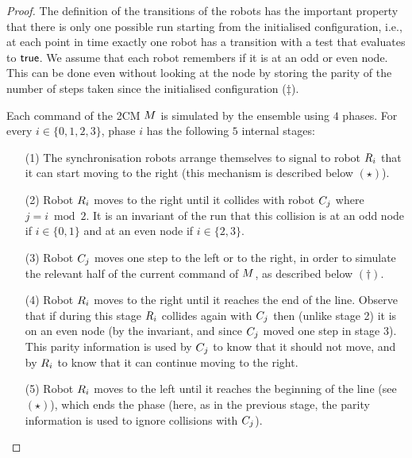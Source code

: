 \begin{proof}
The definition of the transitions of the robots has the important property that there is only one possible run starting from the initialised configuration, i.e., at each point in time exactly one robot has a transition with a test that evaluates to $\mathsf{true}$. We assume that each robot remembers if it is at an odd or even node. This can be done even without looking at the node by storing the parity of the number of steps taken since the initialised configuration ($\ddagger$).

Each command of the 2CM $M$ is simulated by the ensemble using $4$ phases. For every $i \in \{0,1,2,3\}$, phase $i$ has the following $5$ internal stages: 

\begin{enumerate}
 \item[(1)] The synchronisation robots arrange themselves to signal to robot $R_i$ that it can start moving to the right (this mechanism is described below $(\star)$). 
 \item[(2)] Robot $R_i$ moves to the right until it collides with robot $C_j$ where $j = i \bmod 2$. 
 It is an invariant of the run that this collision is at an odd node if $i \in \{0,1\}$ and at an even node if $i \in \{2,3\}$.
 \item[(3)] Robot $C_j$ moves one step to the left or to the right, in order to simulate the relevant half of the current command of $M$, as described below $(\dagger)$.
 \item[(4)] Robot $R_i$ moves to the right until it reaches the end of the line. Observe that if during this stage $R_i$ collides again with $C_j$ then (unlike stage 2) it is on an even node (by the invariant, and since $C_j$ moved one step in stage 3). This parity information is used by $C_j$ to know that it should not move, and by $R_i$ to know that it can continue moving to the right. 
 \item[(5)] Robot $R_i$ moves to the left until it reaches the beginning of the line (see $(\star)$), which ends the phase (here, as in the previous stage, the parity information is used to ignore collisions with $C_j$). 
\end{enumerate}


\end{proof}
